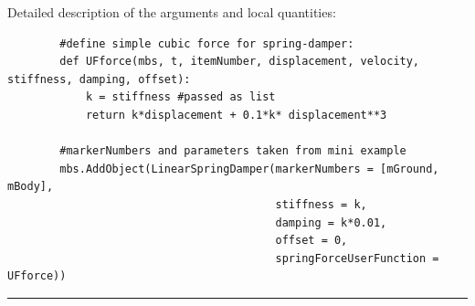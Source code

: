     Detailed description of the arguments and local quantities:
    \finishTable
    \userFunctionExample{}
    \pythonstyle\begin{lstlisting}
        #define simple cubic force for spring-damper:
        def UFforce(mbs, t, itemNumber, displacement, velocity, stiffness, damping, offset): 
            k = stiffness #passed as list
            return k*displacement + 0.1*k* displacement**3
        
        #markerNumbers and parameters taken from mini example
        mbs.AddObject(LinearSpringDamper(markerNumbers = [mGround, mBody], 
                                         stiffness = k, 
                                         damping = k*0.01, 
                                         offset = 0,
                                         springForceUserFunction = UFforce))
    \end{lstlisting}
\vspace{6pt}\par\noindent\rule{\textwidth}{0.4pt}
\label{miniExample_ObjectConnectorLinearSpringDamper}
\pythonstyle
